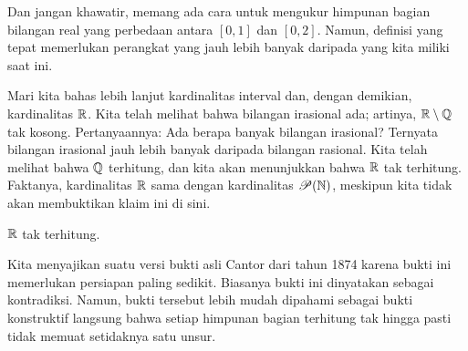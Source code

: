 Dan jangan khawatir, memang ada cara untuk mengukur  himpunan bagian
bilangan real yang
perbedaan antara $[0,1]$ dan $[0,2]$.  Namun, definisi yang tepat
memerlukan perangkat yang jauh lebih banyak daripada yang kita miliki saat ini.

Mari kita bahas lebih lanjut kardinalitas interval dan, dengan demikian,
kardinalitas ${\mathbb{R}}$.  Kita telah melihat bahwa bilangan irasional ada;
artinya,
${\mathbb{R}} \setminus {\mathbb{Q}}$ tak kosong.  Pertanyaannya: Ada berapa banyak bilangan irasional?
Ternyata bilangan irasional jauh lebih banyak daripada bilangan
rasional.  Kita telah melihat bahwa ${\mathbb{Q}}$ terhitung, dan kita akan menunjukkan
bahwa ${\mathbb{R}}$ tak terhitung.
Faktanya, kardinalitas ${\mathbb{R}}$ sama dengan
kardinalitas ${\mathscr{P}}({\mathbb{N}})$, meskipun kita tidak akan membuktikan
klaim ini di sini.

\begin{thm}[Cantor]
${\mathbb{R}}$ tak terhitung.
\end{thm}

Kita menyajikan suatu versi
bukti asli Cantor dari tahun
1874 karena bukti ini memerlukan persiapan paling sedikit.  Biasanya bukti ini dinyatakan
sebagai kontradiksi.  Namun, bukti tersebut lebih mudah
dipahami sebagai bukti konstruktif langsung bahwa setiap himpunan bagian terhitung tak hingga
pasti tidak memuat setidaknya satu unsur.


